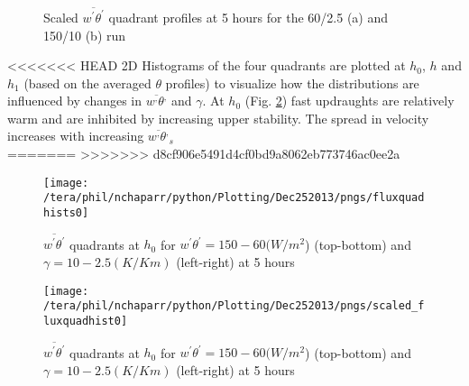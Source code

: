 \begin{figure}[htbp]
\begin{minipage}[b]{0.5\linewidth}
        \\
        \end{minipage}             
\quad
\begin{minipage}[b]{0.5\linewidth}
        \\
       \end{minipage}
        \caption{Scaled $\overline{w^{'} \theta^{'}}$ quadrant profiles at 5 hours for the 60/2.5 (a) and 150/10 (b) run}
        \label{fig:fluxqadprofs}
\end{figure}

<<<<<<< HEAD
2D Histograms of the four quadrants are plotted at $h_{0}$, $h$ and $h_{1}$ (based on the averaged $\theta$ profiles)
to visualize how the distributions are influenced by changes in $\overline{w^{,} \theta^{,}}$ and $\gamma$.  At $h_{0}$
(Fig. \ref{fig:fluxquadsh0}) fast updraughts are relatively warm and are inhibited by increasing upper stability.  The spread
in velocity increases with increasing $\overline{w^{,}\theta^{,}}_{s}$\\

=======
>>>>>>> d8cf906e5491d4cf0bd9a8062eb773746ac0ee2a

\begin{figure}[htbp]
\centering
 \texttt{[image: /tera/phil/nchaparr/python/Plotting/Dec252013/pngs/fluxquadhists0]}                 
\label{fig:fluxquadsh0}
\caption{ $\overline{w^{'}\theta^{'}}$ quadrants at $h_{0}$ for $w^{'}\theta^{'} = 150 - 60 (W/m^{2}$) (top-bottom) and $\gamma = 10 - 2.5 (K/Km)$ (left-right) at 5 hours}
\end{figure}

\begin{figure}[htbp]
\centering
 \texttt{[image: /tera/phil/nchaparr/python/Plotting/Dec252013/pngs/scaled\_fluxquadhist0]}                 
\label{fig:scaled_fluxquadsh0}
\caption{ $\overline{w^{'}\theta^{'}}$ quadrants at $h_{0}$ for $w^{'}\theta^{'} = 150 - 60 (W/m^{2}$) (top-bottom) and $\gamma = 10 - 2.5 (K/Km)$ (left-right) at 5 hours}
\end{figure}



